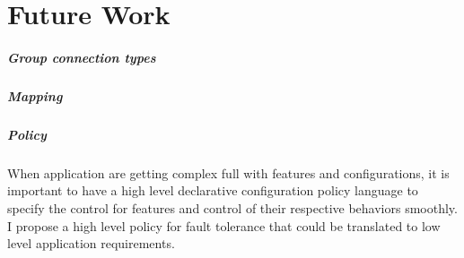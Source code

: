 \chapter{Future Work}
\label{c:future}


\paragraph{Group connection types}

\paragraph{Mapping}

\paragraph{Policy}


When application are getting complex full with features and configurations, 
it is important to have a high level declarative configuration policy language 
to specify the control for features and control of their respective behaviors 
smoothly. I propose a high level policy for fault tolerance that could be
translated to low level application requirements.
